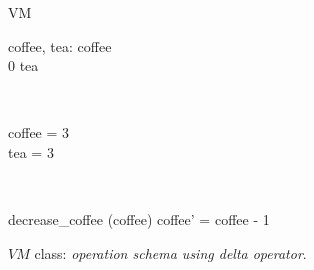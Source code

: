 \begin{figure}[H]
\centering
\begin{class}{VM}
\\
\begin{state}
coffee, tea: \integer
{} \leq  coffee 
\\
0 \leq  tea 
\end{state} 
\\
\begin{init}
coffee = 3
\\tea = 3
\end{init} 
\\
\begin{op}{decrease\_coffee}
\Delta (coffee)
\ST
coffee' = coffee - 1
\end{op}
\end{class}
\caption{$VM$ class: \textit{operation schema using delta operator}.}
\label{oz_vm_op_schema_delta}
\end{figure}